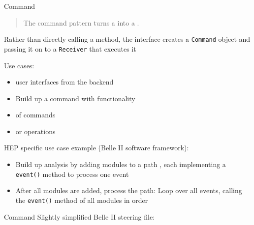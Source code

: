 \begin{frame}{Command}
	\begin{quote}
	The command pattern turns a  into a .
	\end{quote}
	
	\medskip
	Rather than directly calling a method, the interface creates a \texttt{Command} object  and passing it on to a \texttt{Receiver} that executes it
	
	\bigskip
	Use cases:
	\begin{itemize}
		\item {} user interfaces from the backend 
		\item Build up a command  with  functionality
		\item {} of commands
		\item {} or  operations
	\end{itemize}

	\bigskip
	HEP specific use case example (Belle II software framework):
	\begin{itemize}
		\item Build up analysis by adding modules  to a path , each implementing a \texttt{event()} method to process one event
		\item After all modules are added, process the path: Loop over all events, calling the \texttt{event()} method of all modules in order
	\end{itemize}
\end{frame}

\begin{frame}{Command}
	Slightly simplified Belle II steering file:
	
	\inputminted[fontsize=\small]{python}{code/patterns/behavioral/belle2_steering_file.py}
\end{frame}

